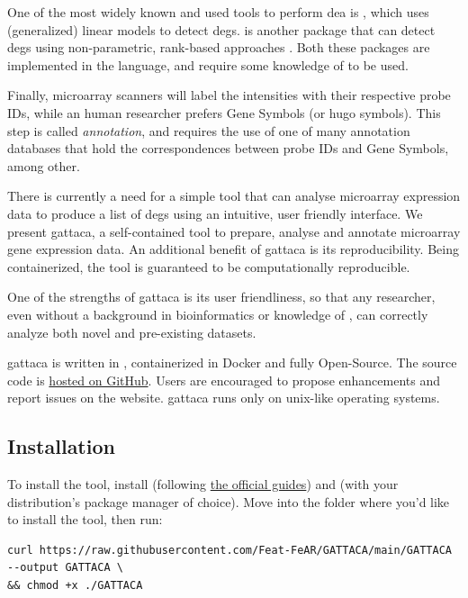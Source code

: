 One of the most widely known and used tools to perform \gls{dea} is , which uses (generalized) linear models to detect \glspl{deg}.  is another package that can detect \glspl{deg} using non-parametric, rank-based approaches \cite{hongRankProdBioconductorPackage2006}. Both these packages are implemented in the  language, and require some knowledge of  to be used.

Finally, microarray scanners will label the intensities with their respective probe IDs, while an human researcher prefers Gene Symbols (or \gls{hugo} symbols). This step is called \textit{annotation}, and requires the use of one of many annotation databases that hold the correspondences between probe IDs and Gene Symbols, among other.

There is currently a need for a simple tool that can analyse microarray expression data to produce a list of \glspl{deg} using an intuitive, user friendly interface. We present \gls{gattaca}, a self-contained tool to prepare, analyse and annotate microarray gene expression data. An additional benefit of \gls{gattaca} is its reproducibility. Being containerized, the tool is guaranteed to be computationally reproducible.

One of the strengths of \gls{gattaca} is its user friendliness, so that any researcher, even without a background in bioinformatics or knowledge of , can correctly analyze both novel and pre-existing datasets.

\gls{gattaca} is written in , containerized in Docker and fully Open-Source. The source code is \href{https://github.com/Feat-FeAR/GATTACA}{hosted on GitHub}. Users are encouraged to propose enhancements and report issues on the website. \gls{gattaca} runs only on unix-like operating systems.

\subsection{Installation}
To install the tool, install  (following \href{https://docs.docker.com/get-docker/}{the official guides}) and  (with your distribution's package manager of choice). Move into the folder where you'd like to install the tool, then run:

\begin{lstlisting}[style=ShellStyle]
curl https://raw.githubusercontent.com/Feat-FeAR/GATTACA/main/GATTACA --output GATTACA \
&& chmod +x ./GATTACA
\end{lstlisting}

